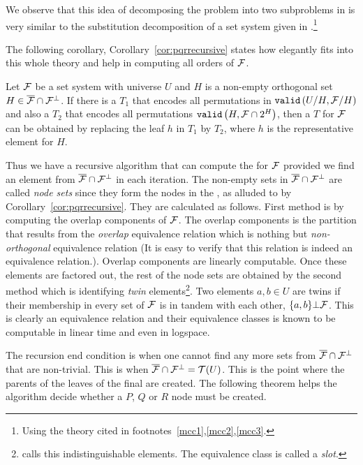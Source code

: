 We observe that this idea of decomposing the \COP problem into two
subproblems in \cite{mm96} is very similar to the substitution
decomposition of a set system given in \cite[Sec.~4]{mcc04}.\footnote{Using
  the theory cited in footnotes~\ref{mcc1},\ref{mcc2},\ref{mcc3}.}

The following corollary, Corollary~\ref{cor:pqrrecursive} states how
\PQRtree elegantly fits into this whole theory and help in computing
all \COP orders of ${\cal F}$.

\begin{corollary}[{\cite[Cor.~8]{mm96}}]
  \label{cor:pqrrecursive}
  Let ${\cal F}$ be a set system with universe $U$ and $H$ is a non-empty
  orthogonal set $H \in \overline{{\cal F}} \cap {\cal F}^{\bot}$. If there is a \PQRtree $T_1$ that
  encodes all permutations in ${\tt valid}\left(U/H, {\cal F}/H\right)$ and also a \PQRtree
  $T_2$ that encodes all permutations ${\tt valid}\left(H,{\cal F} \cap 2^{H}\right)$,
  then a \PQRtree $T$ for ${\cal F}$ can be obtained by replacing the leaf
  $h$ in $T_1$ by $T_2$, where $h$ is the representative element for $H$.
\end{corollary}


Thus we have a recursive algorithm that can compute the \PQRtree for
${\cal F}$ provided we find an element from $\overline{{\cal F}} \cap {\cal F}^{\bot}$ in each iteration. The
non-empty sets in $\overline{{\cal F}} \cap {\cal F}^{\bot}$ are called {\em node sets} since they form the
nodes in the \PQRtree, as alluded to by
Corollary~\ref{cor:pqrrecursive}. They are calculated as follows.
First method is by computing the overlap components of ${\cal F}$. The
overlap components is the partition that results from the {\em
  overlap} equivalence relation which is nothing but {\em
  non-orthogonal} equivalence relation (It is easy to verify
  that this relation is indeed an equivalence relation.). Overlap
components are linearly computable\cite{mm95,wlh92}. Once these
elements are factored out, the rest of the node sets are obtained by
the second method which is identifying {\em twin}
elements\footnote{\cite[Sec.~3]{kklv10} calls this {indistinguishable}
  elements. The equivalence class is called a {\em slot}.}. Two
elements $a, b \in U$ are twins if their membership in every set of
${\cal F}$ is in tandem with each other, \ie $\{a,b\} \bot {\cal F}$. This is
clearly an equivalence relation and their equivalence classes is known
to be computable in linear time\cite{wlh01,mm96-ref11} and even in
logspace\cite{kklv10}.

The recursion end condition is when one cannot find any more sets from
$\overline{{\cal F}} \cap {\cal F}^{\bot}$ that are non-trivial. This is when $\overline{{\cal F}} \cap {\cal F}^{\bot} = {\cal T}(U)$. This is the
point where the parents of the leaves of the final \PQRtree are created. The
following theorem helps the algorithm decide whether a $P$, $Q$ or
$R$ node must be created.

